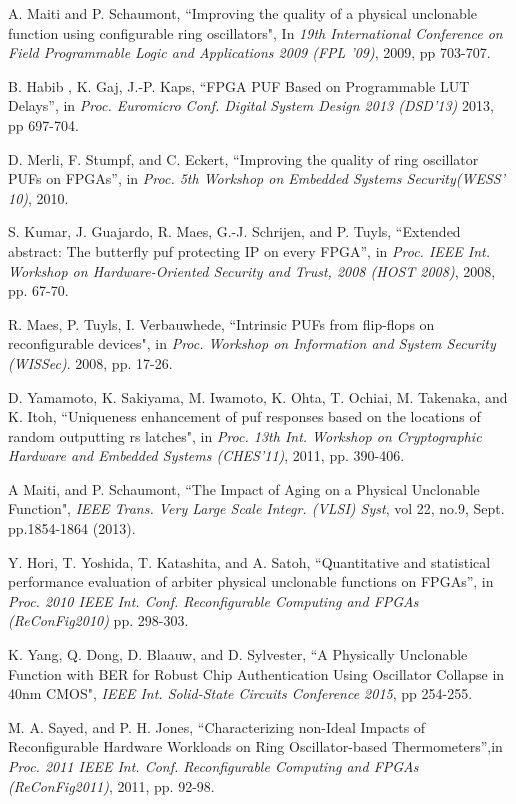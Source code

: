 ﻿\documentclass[aps,preprint,prb,superscriptaddress,amsmath,showpacs,tightenlines]{revtex4}
\begin{document}
\begin{thebibliography}{99}
 A. Maiti and P. Schaumont, ``Improving the quality of
a physical unclonable function using configurable ring
oscillators", In {\it 19th International Conference on Field
Programmable Logic and Applications 2009
(FPL '09)}, 2009, pp 703-707.


 B. Habib , K. Gaj, J.-P. Kaps, “FPGA PUF Based on Programmable
LUT Delays”, in {\it Proc. Euromicro Conf. Digital System Design 2013 (DSD'13)} 
2013, pp 697-704.

 D. Merli, F. Stumpf, and C. Eckert, “Improving the quality of ring oscillator
PUFs on FPGAs”, in {\it Proc. 5th Workshop on Embedded
Systems Security(WESS' 10)}, 2010.



  S. Kumar, J. Guajardo, R. Maes, G.-J. Schrijen, and P. Tuyls, “Extended
abstract: The butterfly puf protecting IP on every FPGA”, in
{\it Proc. IEEE Int. Workshop on Hardware-Oriented Security and Trust,
2008 (HOST 2008)}, 2008, pp. 67-70.

R. Maes, P. Tuyls, I. Verbauwhede, 
``Intrinsic PUFs from flip-flops on reconfigurable devices", in {\it Proc. Workshop
on Information and System Security (WISSec)}. 2008, pp. 17-26.

 D. Yamamoto, K. Sakiyama, M. Iwamoto, K. Ohta, T. Ochiai, M. Takenaka, and
K. Itoh, ``Uniqueness enhancement of puf responses based on the locations of random
outputting rs latches",
in {\it Proc. 13th Int. Workshop on
Cryptographic Hardware and Embedded Systems (CHES’11)}, 2011,
pp. 390-406.

A Maiti, and P. Schaumont, 
``The Impact of Aging on a Physical Unclonable Function",
{\it IEEE Trans. Very Large
Scale Integr. (VLSI) Syst}, vol 22, no.9, Sept. pp.1854-1864 (2013).

 Y. Hori, T. Yoshida, T. Katashita, and A. Satoh, “Quantitative
and statistical performance evaluation of arbiter physical unclonable
functions on FPGAs”, in 
{\it Proc. 2010 IEEE Int. Conf. Reconfigurable Computing and FPGAs (ReConFig2010)}
pp. 298-303.

K. Yang, Q. Dong, D. Blaauw, and D. Sylvester,
``A Physically Unclonable Function with BER for
Robust Chip Authentication Using Oscillator Collapse
in 40nm CMOS",
{\it IEEE Int. Solid-State Circuits Conference  2015}, pp 254-255.


M. A. Sayed, and P. H. Jones, “Characterizing non-Ideal Impacts of Reconfigurable Hardware Workloads on Ring Oscillator-based Thermometers”,in {\it Proc. 2011 IEEE Int. Conf. Reconfigurable Computing and FPGAs (ReConFig2011)}, 2011, pp. 92-98.

\end{thebibliography}
\end{document}
